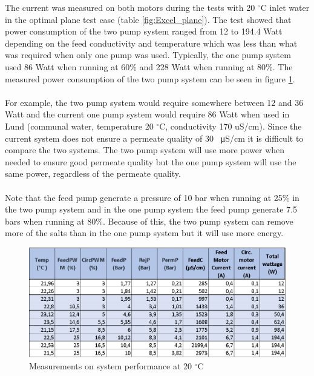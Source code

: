 The current was measured on both motors during the tests with 20 $^{\circ}$C inlet water in the optimal plane test case (table \ref{fig:Excel_plane}). The test showed that power consumption of the two pump system ranged from 12 to 194.4 Watt depending on the feed conductivity and temperature which was less than what was required when only one pump was used. Typically, the one pump system used 86 Watt when running at 60\% and 228 Watt when running at 80\%. The measured power consumption of the two pump system can be seen in figure \ref{fig:EnergySys2}. \\
\\
For example, the two pump system would require somewhere between 12 and 36 Watt and the current one pump system would require 86 Watt when used in Lund (communal water, temperature 20 $^{\circ}$C, conductivity 170 uS/cm).  Since the current system does not ensure a permeate quality of 30 \SI{}{\micro\siemens}/cm it is difficult to compare the two systems. The two pump system will use more power when needed to ensure good permeate quality but the one pump system will use the same power, regardless of the permeate quality. \\
\\
Note that the feed pump generate a pressure of 10 bar when running at 25\% in the two pump system and in the one pump system the feed pump generate 7.5 bars when running at 80\%. Because of this, the two pump system can remove more of the salts than in the one pump system but it will use more energy. 

\begin{figure}[H]
    \centering
    \includegraphics[width=1.1\textwidth]{EnergySys2}
    \caption{Measurements on system performance at 20 $^{\circ}$C}
    \label{fig:EnergySys2}
\end{figure}














